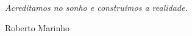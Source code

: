 \begin{epigrafe}
  \vspace*{\fill}
  \epigraph{\textit{Acreditamos no sonho e construímos a realidade.}}{Roberto Marinho}
\end{epigrafe}
